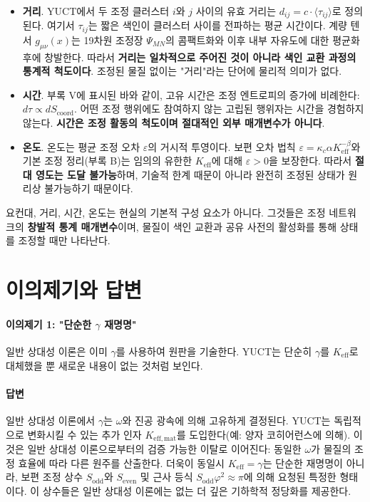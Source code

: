 \documentclass[12pt,a4paper]{article}
\newcommand{\Sodd}{S_{\mathrm{odd}}}
\newcommand{\Seven}{S_{\mathrm{even}}}
\begin{document}
	\begin{itemize}
		\item \textbf{거리}. YUCT에서 두 조정 클러스터 \(i\)와 \(j\) 사이의 유효 거리는 \(d_{ij} = c \cdot \langle \tau_{ij} \rangle\)로 정의된다. 여기서 \(\tau_{ij}\)는 짧은 색인이 클러스터 사이를 전파하는 평균 시간이다. 계량 텐서 \(g_{\mu\nu}(x)\)는 19차원 조정장 \(\Psi_{MN}\)의 콤팩트화와 이후 내부 자유도에 대한 평균화 후에 창발한다. 따라서 \textbf{거리는 일차적으로 주어진 것이 아니라 색인 교환 과정의 통계적 척도이다}. 조정된 물질 없이는 "거리"라는 단어에 물리적 의미가 없다.
		
		\item \textbf{시간}. 부록 V에 표시된 바와 같이, 고유 시간은 조정 엔트로피의 증가에 비례한다: \(d\tau \propto dS_{\mathrm{coord}}\). 어떤 조정 행위에도 참여하지 않는 고립된 행위자는 시간을 경험하지 않는다. \textbf{시간은 조정 활동의 척도이며 절대적인 외부 매개변수가 아니다}.
		
		\item \textbf{온도}. 온도는 평균 조정 오차 \(\varepsilon\)의 거시적 투영이다. 보편 오차 법칙 \(\varepsilon = \kappa_c \alpha K_{\mathrm{eff}}^{-\beta}\)와 기본 조정 정리(부록 B)는 임의의 유한한 \(K_{\mathrm{eff}}\)에 대해 \(\varepsilon > 0\)을 보장한다. 따라서 \textbf{절대 영도는 도달 불가능}하며, 기술적 한계 때문이 아니라 완전히 조정된 상태가 원리상 불가능하기 때문이다.
	\end{itemize}
	
	요컨대, 거리, 시간, 온도는 현실의 기본적 구성 요소가 아니다. 그것들은 조정 네트워크의 \textbf{창발적 통계 매개변수}이며, 물질이 색인 교환과 공유 사전의 활성화를 통해 상태를 조정할 때만 나타난다.
	
	\section{이의제기와 답변}
	\label{sec:objections}
	
	\paragraph{이의제기 1: "단순한 \(\gamma\) 재명명"}
	일반 상대성 이론은 이미 \(\gamma\)를 사용하여 원판을 기술한다. YUCT는 단순히 \(\gamma\)를 \(K_{\mathrm{eff}}\)로 대체했을 뿐 새로운 내용이 없는 것처럼 보인다.
	
	\paragraph{답변}
	일반 상대성 이론에서 \(\gamma\)는 \(\omega\)와 진공 광속에 의해 고유하게 결정된다. YUCT는 독립적으로 변화시킬 수 있는 추가 인자 \(K_{\mathrm{eff,mat}}\)를 도입한다(예: 양자 코히어런스에 의해). 이것은 일반 상대성 이론으로부터의 검증 가능한 이탈로 이어진다: 동일한 \(\omega\)가 물질의 조정 효율에 따라 다른 원주를 산출한다. 더욱이 동일시 \(K_{\mathrm{eff}} = \gamma\)는 단순한 재명명이 아니라, 보편 조정 상수 \(\Sodd\)와 \(\Seven\) 및 근사 등식 \(\Sodd \varphi^2 \approx \pi\)에 의해 요청된 특정한 형태이다. 이 상수들은 일반 상대성 이론에는 없는 더 깊은 기하학적 정당화를 제공한다.
	
\end{document}
